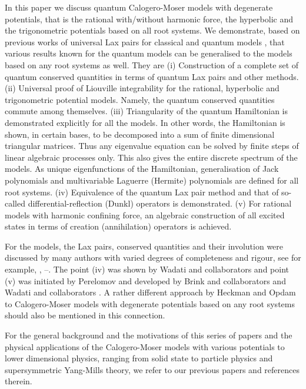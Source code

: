 \documentclass[a4paper,12pt]{article}
\begin{document}
In this paper we discuss quantum Calogero-Moser models with degenerate
potentials, that is the rational with/without harmonic force, the
hyperbolic and the trigonometric potentials based on all root systems.
We demonstrate, based on previous works of universal Lax pairs for
classical \cite{bcs1,bcs2,DHoker_Phong} and quantum models
\cite{bms}, that various results known for the quantum \coordHE{} models can
be generalised to  the models based on any root systems as well. They are
(i) Construction of a complete set of quantum conserved quantities in
terms of quantum Lax pairs and other methods.
(ii) Universal proof of Liouville integrability for the rational,
hyperbolic and trigonometric potential models.
Namely, the quantum conserved quantities commute among themselves.
(iii) Triangularity of the quantum Hamiltonian
is demonstrated explicitly for all the models.
In other words, the Hamiltonian is shown, in certain bases, to be
decomposed into a sum of finite dimensional triangular matrices.
Thus any eigenvalue equation can be solved by finite steps of linear
algebraic processes only. This also gives the entire discrete spectrum of
the models. As unique eigenfunctions of the Hamiltonian, generalisation of
Jack polynomials and multivariable Laguerre (Hermite) polynomials are
defined for all root systems.
(iv) Equivalence of the quantum Lax pair method and that of so-called
differential-reflection (Dunkl) operators \cite{Dunk} is demonstrated.
(v) For rational models with harmonic confining force, an algebraic
construction of all excited states in terms of creation (annihilation)
operators is achieved.

For the \coordHE{} models, the Lax pairs, conserved quantities and their
involution were discussed by many authors with varied degrees of
completeness and rigour, see for example,
\cite{OP2}, \cite{OP3}--\cite{Ruijs}.
The point (iv) was shown by Wadati and  collaborators \cite{UjWa}
and point (v) was initiated by Perelomov \cite{Pere1} and developed by
Brink and collaborators \cite{Br} and Wadati and  collaborators
\cite{UjWa}. A rather different approach by Heckman and Opdam
\cite{Heck2,HeOp} to Calogero-Moser models with degenerate potentials
based on any root systems should also be mentioned in this connection.

For the general background and the motivations of this
series of papers and the physical applications of the
Calogero-Moser models with various potentials to
lower dimensional physics, ranging from solid state to
particle physics and   supersymmetric Yang-Mills theory, we refer to our
previous papers \cite{bcs1,bcs2} and references therein.
\end{document}
